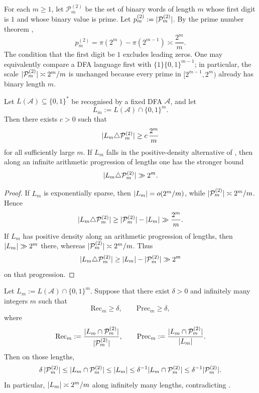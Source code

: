 For each \(m\ge 1\), let \(\mathcal P_m^{(2)}\) be the set of binary
words of length \(m\) whose first digit is \(1\) and whose binary value
is prime. Let \(p_m^{(2)}:=\lvert \mathcal P_m^{(2)} \rvert\). By the prime
number theorem \cite{HardyWright2008},
\[
  p_m^{(2)}
  =\pi(2^m)-\pi(2^{m-1})
  \asymp \frac{2^m}{m}.
\]
The condition that the first digit be \(1\) excludes leading zeros. One
may equivalently compare a DFA language first with
\(\{1\}\{0,1\}^{m-1}\); in particular, the scale
\(\lvert \mathcal P_m^{(2)} \rvert\asymp 2^m/m\) is unchanged because every
prime in \([2^{m-1},2^m)\) already has binary length \(m\).

\begin{corollary}
  \label{cor:dfa-prime-symmetric-diff}
  Let \(L(\mathcal A)\subseteq\{0,1\}^\ast\) be recognised by a fixed
  DFA \(\mathcal A\), and let
  \[
    L_m:=L(\mathcal A)\cap\{0,1\}^m.
  \]
  Then there exists \(c>0\) such that
  \[
    \lvert L_m\triangle \mathcal P_m^{(2)} \rvert
    \ge c\,\frac{2^m}{m}
  \]
  for all sufficiently large \(m\). If \(L_m\) falls in the
  positive-density alternative of ,
  then along an infinite arithmetic progression of lengths one has the
  stronger bound
  \[
    \lvert L_m\triangle \mathcal P_m^{(2)} \rvert\gg 2^m.
  \]
\end{corollary}

\begin{proof}
  If \(L_m\) is exponentially sparse, then
  \(\lvert L_m \rvert=o(2^m/m)\), while
  \(\lvert \mathcal P_m^{(2)} \rvert\asymp 2^m/m\). Hence
  \[
    \lvert L_m\triangle \mathcal P_m^{(2)} \rvert
    \ge \lvert \mathcal P_m^{(2)} \rvert-\lvert L_m \rvert
    \gg \frac{2^m}{m}.
  \]
  If \(L_m\) has positive density along an arithmetic progression of
  lengths, then \(\lvert L_m \rvert\gg 2^m\) there, whereas
  \(\lvert \mathcal P_m^{(2)} \rvert\asymp 2^m/m\). Thus
  \[
    \lvert L_m\triangle \mathcal P_m^{(2)} \rvert
    \ge \lvert L_m \rvert-\lvert \mathcal P_m^{(2)} \rvert
    \gg 2^m
  \]
  on that progression.
\end{proof}

\begin{proposition}\label{prop:dfa-quantitative-obstruction}
  Let \(L_m:=L(\mathcal A)\cap\{0,1\}^m\). Suppose that there exist
  \(\delta>0\) and infinitely many integers \(m\) such that
  \[
    \mathrm{Rec}_m\ge \delta,
    \qquad
    \mathrm{Prec}_m\ge \delta,
  \]
  where
  \[
    \mathrm{Rec}_m
    :=\frac{\lvert L_m\cap\mathcal P_m^{(2)} \rvert}{\lvert \mathcal P_m^{(2)} \rvert},
    \qquad
    \mathrm{Prec}_m
    :=\frac{\lvert L_m\cap\mathcal P_m^{(2)} \rvert}{\lvert L_m \rvert}.
  \]
  Then on those lengths,
  \[
    \delta\,\lvert \mathcal P_m^{(2)} \rvert
    \le \lvert L_m\cap\mathcal P_m^{(2)} \rvert
    \le \lvert L_m \rvert
    \le \delta^{-1}\lvert L_m\cap\mathcal P_m^{(2)} \rvert
    \le \delta^{-1}\lvert \mathcal P_m^{(2)} \rvert.
  \]
  In particular, \(\lvert L_m \rvert\asymp 2^m/m\) along infinitely many
  lengths, contradicting .
\end{proposition}

